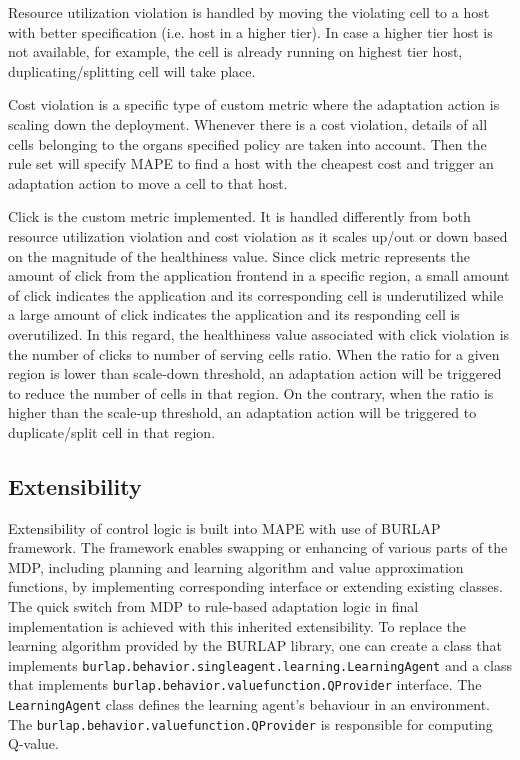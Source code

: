\documentclass{seal_thesis}
\begin{document}
Resource utilization violation is handled by moving the violating cell to a host with better specification (i.e. host in a higher tier).
In case a higher tier host is not available, for example, the cell is already running on highest tier host, duplicating/splitting cell will take place.

Cost violation is a specific type of custom metric where the adaptation action is scaling down the deployment.
Whenever there is a cost violation, details of all cells belonging to the organs specified policy are taken into account.
Then the rule set will specify MAPE to find a host with the cheapest cost and trigger an adaptation action to move a cell to that host.

Click is the custom metric implemented.
It is handled differently from both resource utilization violation and cost violation as it scales up/out or down based on the magnitude of the healthiness value.
Since click metric represents the amount of click from the application frontend in a specific region, a small amount of click indicates the application and its corresponding cell is underutilized while a large amount of click indicates the application and its responding cell is overutilized.
In this regard, the healthiness value associated with click violation is the number of clicks to number of serving cells ratio.
When the ratio for a given region is lower than scale-down threshold, an adaptation action will be triggered to reduce the number of cells in that region.
On the contrary, when the ratio is higher than the scale-up threshold, an adaptation action will be triggered to duplicate/split cell in that region.

\subsection{Extensibility}
\begin{sloppypar}
Extensibility of control logic is built into MAPE with use of BURLAP framework.
The framework enables swapping or enhancing of various parts of the MDP, including planning and learning algorithm and value approximation functions, by implementing corresponding interface or extending existing classes.
The quick switch from MDP to rule-based adaptation logic in final implementation is achieved with this inherited extensibility.
To replace the learning algorithm provided by the BURLAP library, one can create a class that implements \texttt{burlap.behavior.singleagent.learning.LearningAgent} and a class that implements \texttt{burlap.behavior.valuefunction.QProvider} interface.
The \texttt{LearningAgent} class defines the learning agent's behaviour in an environment.
The \texttt{burlap.behavior.valuefunction.QProvider} is responsible for computing Q-value.
\end{sloppypar}
\end{document}
